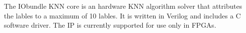 The IObundle KNN core is an hardware KNN algorithm solver that attributes the lables to a maximum of 10 lables. It is written in Verilog and includes a C software driver.  The IP is currently supported for use only in FPGAs.
